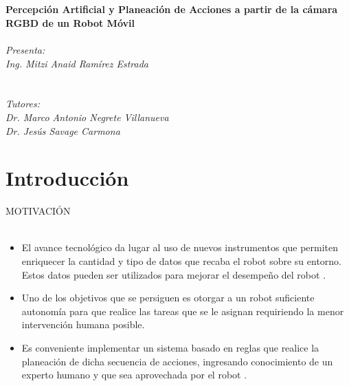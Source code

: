 \documentclass[handout,t]{beamer}
\begin{document}
\begin{frame}{}
\phantom{sd}\\
\phantom{sd}\\
\centering\textbf{{\Large Percepción Artificial y Planeación de Acciones a partir de la cámara RGBD de un Robot Móvil}}
\\

\phantom{sd}\\
\emph{Presenta:\\ Ing. Mitzi Anaid Ramírez Estrada\\ }
\phantom{sd}\\\phantom{sd}\\
\emph{Tutores: \\Dr. Marco Antonio Negrete Villanueva\\  Dr. Jesús Savage Carmona\\\phantom{sd}}

\end{frame}






\section{Introducción}
\begin{frame}{MOTIVACIÓN}
    \phantom{sd}\\
    \phantom{sd}\\
    \begin{itemize}
        \item El avance tecnológico da lugar al uso de nuevos instrumentos que permiten enriquecer la cantidad y tipo de datos que recaba el robot sobre su entorno. Estos datos pueden ser utilizados para mejorar el desempeño del robot \cite{Kasaei2020}.
        \item Uno de los objetivos que se persiguen es otorgar a un robot suficiente autonomía para que realice las tareas que se le asignan requiriendo la menor intervención humana posible.
        \item Es conveniente implementar un sistema basado en reglas que realice la planeación de dicha secuencia de acciones, ingresando conocimiento de un experto humano y que sea aprovechada por el robot \cite{SAVAGE201977}.
     \end{itemize}
    \end{frame}
\end{document}
